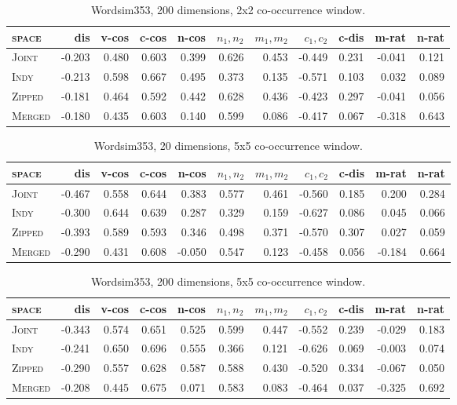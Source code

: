 \begin{table}
\begin{tabular}{lrrrrrrrrrr}
\hline
\textsc{space} & dis & v-cos & c-cos & n-cos & $n_1,n_2$ & $m_1,m_2$ & $c_1,c_2$ & c-dis & m-rat & n-rat \\
\hline
\textsc{Joint} & -0.203 & 0.480 & 0.603 & 0.399 & 0.626 & 0.453 & -0.449 & 0.231 & -0.041 & 0.121 \\
\textsc{Indy} & -0.213 & 0.598 & 0.667 & 0.495 & 0.373 & 0.135 & -0.571 & 0.103 & 0.032 & 0.089 \\
\textsc{Zipped} & -0.181 & 0.464 & 0.592 & 0.442 & 0.628 & 0.436 & -0.423 & 0.297 & -0.041 & 0.056 \\
\textsc{Merged} & -0.180 & 0.435 & 0.603 & 0.140 & 0.599 & 0.086 & -0.417 & 0.067 & -0.318 & 0.643 \\
\hline
\end{tabular}
\caption{Wordsim353, 200 dimensions, 2x2 co-occurrence window.}
\end{table}

\begin{table}
\begin{tabular}{lrrrrrrrrrr}
\hline
\textsc{space} & dis & v-cos & c-cos & n-cos & $n_1,n_2$ & $m_1,m_2$ & $c_1,c_2$ & c-dis & m-rat & n-rat \\
\hline
\textsc{Joint} & -0.467 & 0.558 & 0.644 & 0.383 & 0.577 & 0.461 & -0.560 & 0.185 & 0.200 & 0.284 \\
\textsc{Indy} & -0.300 & 0.644 & 0.639 & 0.287 & 0.329 & 0.159 & -0.627 & 0.086 & 0.045 & 0.066 \\
\textsc{Zipped} & -0.393 & 0.589 & 0.593 & 0.346 & 0.498 & 0.371 & -0.570 & 0.307 & 0.027 & 0.059 \\
\textsc{Merged} & -0.290 & 0.431 & 0.608 & -0.050 & 0.547 & 0.123 & -0.458 & 0.056 & -0.184 & 0.664 \\
\hline
\end{tabular}
\caption{Wordsim353, 20 dimensions, 5x5 co-occurrence window.}
\end{table}

\begin{table}
\begin{tabular}{lrrrrrrrrrr}
\hline
\textsc{space} & dis & v-cos & c-cos & n-cos & $n_1,n_2$ & $m_1,m_2$ & $c_1,c_2$ & c-dis & m-rat & n-rat \\
\hline
\textsc{Joint} & -0.343 & 0.574 & 0.651 & 0.525 & 0.599 & 0.447 & -0.552 & 0.239 & -0.029 & 0.183 \\
\textsc{Indy} & -0.241 & 0.650 & 0.696 & 0.555 & 0.366 & 0.121 & -0.626 & 0.069 & -0.003 & 0.074 \\
\textsc{Zipped} & -0.290 & 0.557 & 0.628 & 0.587 & 0.588 & 0.430 & -0.520 & 0.334 & -0.067 & 0.050 \\
\textsc{Merged} &-0.208 & 0.445 & 0.675 & 0.071 & 0.583 & 0.083 & -0.464 & 0.037 & -0.325 & 0.692 \\
\hline
\end{tabular}
\caption{Wordsim353, 200 dimensions, 5x5 co-occurrence window.}
\end{table}

